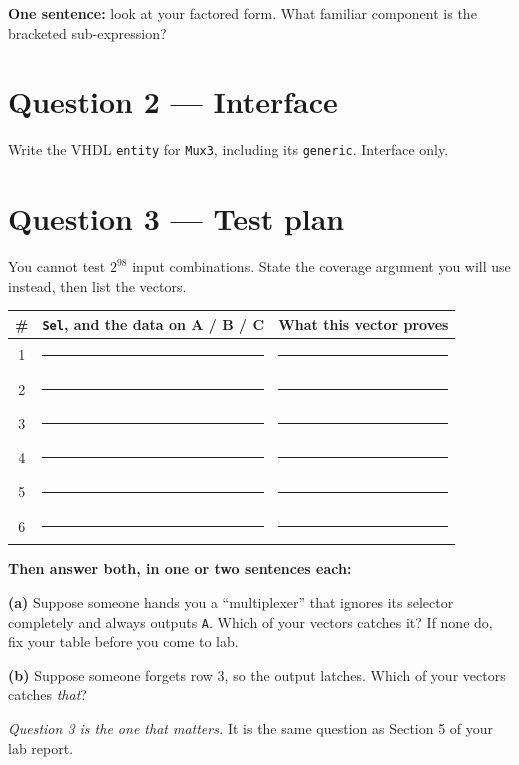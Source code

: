 \documentclass[11pt]{article}
\newcommand{\code}[1]{\texttt{#1}}
\newcommand{\answerbox}[1]{\vspace{2pt}\fbox{\parbox[c][#1][c]{\dimexpr\linewidth-2\fboxsep-2\fboxrule}{\ }}\vspace{4pt}}
\begin{document}
\answerbox{2.6cm}

\textbf{One sentence:} look at your factored form. What familiar component is the
bracketed sub-expression?

\answerbox{1.2cm}

\section*{Question 2 --- Interface}

Write the VHDL \code{entity} for \code{Mux3}, including its \code{generic}.
Interface only.

\answerbox{4.4cm}

\section*{Question 3 --- Test plan}

You cannot test $2^{98}$ input combinations. State the coverage argument you will
use instead, then list the vectors.

\begin{center}
\begin{tabular}{@{}c@{\hskip 8pt}p{4.4cm}@{\hskip 8pt}p{8.2cm}@{}}
\toprule
\# & \code{Sel}, and the data on A / B / C & What this vector proves \\
\midrule
1 & \rule{4.2cm}{0.4pt} & \rule{8cm}{0.4pt} \\[8pt]
2 & \rule{4.2cm}{0.4pt} & \rule{8cm}{0.4pt} \\[8pt]
3 & \rule{4.2cm}{0.4pt} & \rule{8cm}{0.4pt} \\[8pt]
4 & \rule{4.2cm}{0.4pt} & \rule{8cm}{0.4pt} \\[8pt]
5 & \rule{4.2cm}{0.4pt} & \rule{8cm}{0.4pt} \\[8pt]
6 & \rule{4.2cm}{0.4pt} & \rule{8cm}{0.4pt} \\
\bottomrule
\end{tabular}
\end{center}

\textbf{Then answer both, in one or two sentences each:}

\textbf{(a)} Suppose someone hands you a ``multiplexer'' that ignores its selector
completely and always outputs \code{A}. Which of your vectors catches it? If none
do, fix your table before you come to lab.

\answerbox{1.8cm}

\textbf{(b)} Suppose someone forgets row 3, so the output latches. Which of your
vectors catches \emph{that}?

\answerbox{1.8cm}

\vfill
{\small\emph{Question 3 is the one that matters.} It is the same question as
Section 5 of your lab report.}
\end{document}
